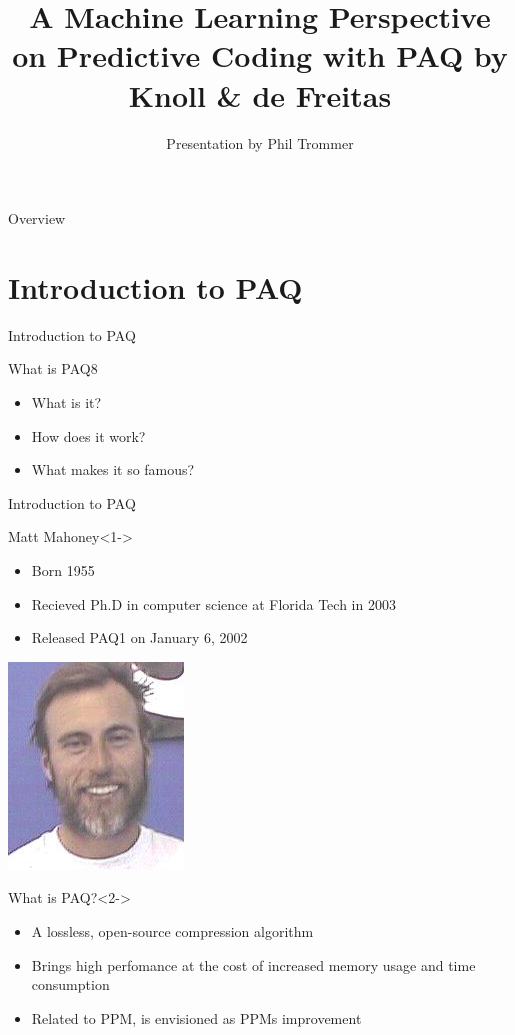 \documentclass[11pt,usenames,dvipsnames]{beamer}
\author{Presentation by Phil Trommer}
\title{A Machine Learning Perspective on Predictive Coding with PAQ by Knoll \& de Freitas}
\begin{document}
\begin{frame}
\titlepage
\end{frame}


\begin{frame}{Overview}
\tableofcontents
\end{frame}


\section{Introduction to PAQ}


\begin{frame}{Introduction to PAQ}
	\begin{block}{What is PAQ8}
			\begin{itemize}
				\item What is it?
				\item How does it work?
				\item What makes it so famous?
			\end{itemize}
	\end{block}
\end{frame}

\begin{frame}{Introduction to PAQ}
	\begin{exampleblock}{Matt Mahoney}<1->
	\begin{minipage}[b]{0.70\linewidth}
		\begin{itemize}
			\item Born 1955
			\item Recieved Ph.D in computer science at Florida Tech in 2003
			\item Released PAQ1 on January 6, 2002
		\end{itemize}
	\hfill
	\end{minipage}
	\begin{minipage}[b]{0.28\linewidth}
		\includegraphics[scale=1.5]{files/matt.jpg}
	\end{minipage}
	\end{exampleblock}
	
	\begin{alertblock}{What is PAQ?}<2->
		\begin{itemize}
			\item A lossless, open-source compression algorithm
			\item Brings high perfomance at the cost of increased memory usage and time consumption
			\item Related to PPM, is envisioned as PPMs improvement
		\end{itemize}
	\end{alertblock}
\end{frame}
\end{document}
